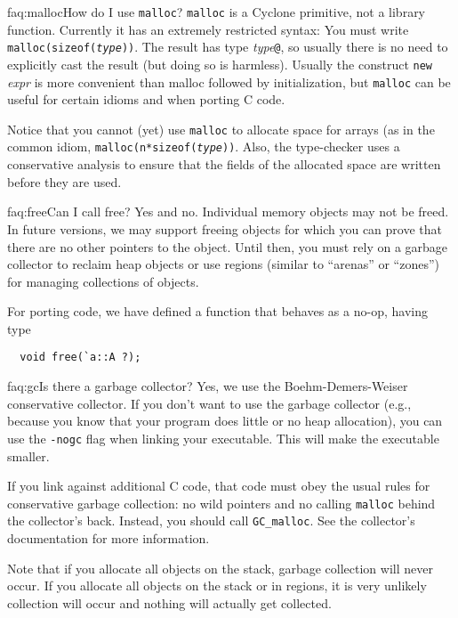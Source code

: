 \begin{faqa}{faq:malloc}{How do I use \texttt{malloc}?}
\texttt{malloc} is a Cyclone primitive, not a library function.
Currently it has an extremely restricted syntax: You must write
\texttt{malloc(sizeof(\textit{type}))}.  The result has type
\textit{type}\texttt{@}, so usually there is no need to explicitly
cast the result (but doing so is harmless).  Usually the construct
\texttt{new} \textit{expr} is more convenient than malloc followed by
initialization, but \texttt{malloc} can be useful for certain idioms
and when porting C code.

Notice that you cannot (yet) use \texttt{malloc} to allocate space for
arrays (as in the common idiom, \texttt{malloc(n*sizeof({\it type}))}.
Also, the type-checker uses a conservative analysis to ensure that the
fields of the allocated space are written before they are used.
\end{faqa}

\begin{faqa}{faq:free}{Can I call free?}
Yes and no. Individual memory objects may not be freed.  In future versions,
we may support freeing objects for which you can prove that there are no
other pointers to the object.  Until then, you must rely on a garbage
collector to reclaim heap objects or use regions (similar to ``arenas'' or
``zones'') for managing collections of objects.

For porting code, we have defined a  function that behaves as a
no-op, having type
\begin{verbatim}
  void free(`a::A ?);
\end{verbatim}
\end{faqa}

\begin{faqa}{faq:gc}{Is there a garbage collector?}
Yes, we use the Boehm-Demers-Weiser conservative collector.  If you
don't want to use the garbage collector (e.g., because you know that
your program does little or no heap allocation), you can use the
\texttt{-nogc} flag when linking your executable.  This will make the
executable smaller.

If you link against additional C code, that code must obey the usual
rules for conservative garbage collection: no wild pointers and no
calling \texttt{malloc} behind the collector's back.  Instead, you
should call \texttt{GC_malloc}.  See the collector's documentation for
more information.

Note that if you allocate all objects on the stack, garbage collection
will never occur.  If you allocate all objects on the stack or in
regions, it is very unlikely collection will occur and nothing will
actually get collected.
\end{faqa}

